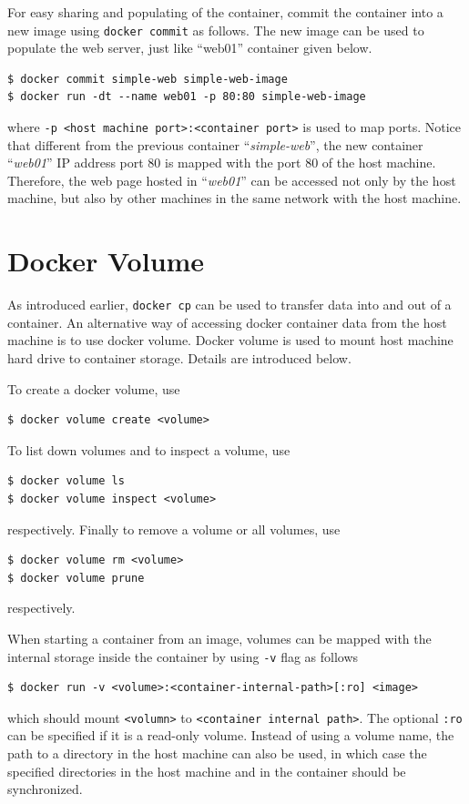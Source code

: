 For easy sharing and populating of the container, commit the container into a new image using \verb|docker commit| as follows. The new image can be used to populate the web server, just like ``web01'' container given below.
\begin{lstlisting}
$ docker commit simple-web simple-web-image
$ docker run -dt --name web01 -p 80:80 simple-web-image
\end{lstlisting}
where \verb|-p <host machine port>:<container port>| is used to map ports. Notice that different from the previous container ``\textit{simple-web}'', the new container ``\textit{web01}'' IP address port 80 is mapped with the port 80 of the host machine. Therefore, the web page hosted in ``\textit{web01}'' can be accessed not only by the host machine, but also by other machines in the same network with the host machine.

\section{Docker Volume} \label{ch:vac:subsec:dockervolume}

As introduced earlier, \verb|docker cp| can be used to transfer data into and out of a container. An alternative way of accessing docker container data from the host machine is to use docker volume. Docker volume is used to mount host machine hard drive to container storage. Details are introduced below.

To create a docker volume, use
\begin{lstlisting}
$ docker volume create <volume>
\end{lstlisting}
To list down volumes and to inspect a volume, use
\begin{lstlisting}
$ docker volume ls
$ docker volume inspect <volume>
\end{lstlisting}
respectively. Finally to remove a volume or all volumes, use
\begin{lstlisting}
$ docker volume rm <volume>
$ docker volume prune
\end{lstlisting}
respectively.

When starting a container from an image, volumes can be mapped with the internal storage inside the container by using \verb|-v| flag as follows
\begin{lstlisting}
$ docker run -v <volume>:<container-internal-path>[:ro] <image>
\end{lstlisting}
which should mount \verb|<volumn>| to \verb|<container internal path>|. The optional \verb|:ro| can be specified if it is a read-only volume. Instead of using a volume name, the path to a directory in the host machine can also be used, in which case the specified directories in the host machine and in the container should be synchronized.


